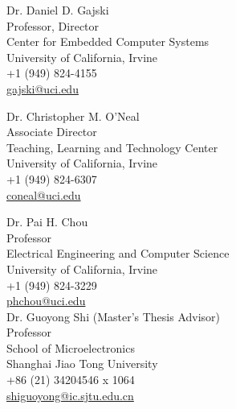 \vspace{5mm}

Dr. Daniel D. Gajski \\
Professor, Director\\
Center for Embedded Computer Systems\\
University of California, Irvine\\
+1 (949) 824-4155\\
\href{mailto:gajski@uci.edu}{gajski@uci.edu}\\

\vspace{10mm}


Dr. Christopher M. O'Neal \\
Associate Director \\
Teaching, Learning and Technology Center\\
University of California, Irvine\\
+1 (949) 824-6307\\
\href{mailto:coneal@uci.edu}{coneal@uci.edu}\\

\vspace{5mm}

Dr. Pai H. Chou\\
Professor\\
Electrical Engineering and Computer Science\\
University of California, Irvine\\
+1 (949) 824-3229\\
\href{mailto:phchou@uci.edu}{phchou@uci.edu}\\

\vspace{5mm}
Dr. Guoyong Shi (Master's Thesis Advisor)\\
Professor \\
School of Microelectronics \\
Shanghai Jiao Tong University\\
+86 (21) 34204546 x 1064\\
\href{mailto:shiguoyong@ic.sjtu.edu.cn}{shiguoyong@ic.sjtu.edu.cn}\\

